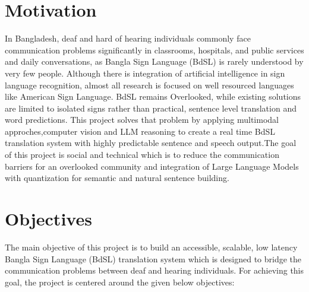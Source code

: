 \section{Motivation}
In Bangladesh, deaf and hard of hearing individuals commonly face communication problems significantly in classrooms, hospitals, and public services and daily conversations, as Bangla Sign Language (BdSL) is rarely understood by very few people. Although there is integration of artificial intelligence in sign language recognition, almost all research is focused on well resourced languages like American Sign Language. BdSL remains Overlooked, while existing solutions are limited to isolated signs rather than practical, sentence level translation and word predictions.
This project solves that problem by applying multimodal approches,computer vision and LLM reasoning to create a real time BdSL translation system with highly predictable sentence and speech output.The goal of this project is social and technical which is to reduce the communication barriers for an overlooked community and integration of Large Language Models with quantization for semantic and natural sentence building.

\section{Objectives}
The main objective of this project is to build an accessible, scalable, low latency Bangla Sign Language (BdSL) translation system which is designed to  bridge the communication problems between deaf and hearing individuals. For achieving this goal, the project is centered around the  given below objectives: 

